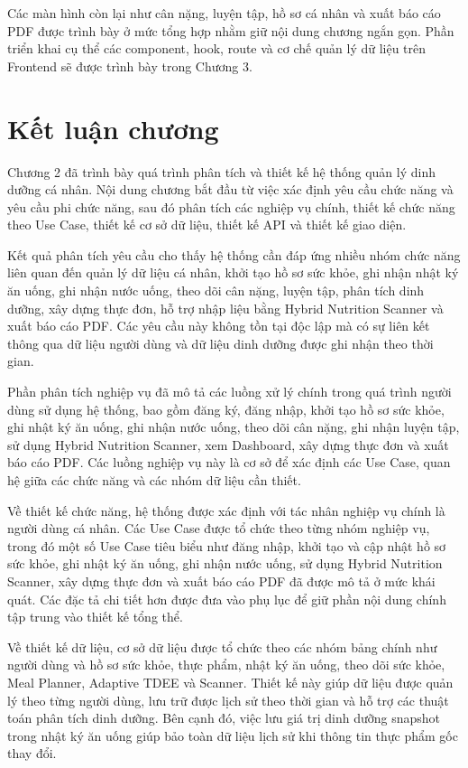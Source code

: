\documentclass[12pt, a4paper]{report}
\begin{document}
Các màn hình còn lại như cân nặng, luyện tập, hồ sơ cá nhân và xuất báo cáo PDF được trình bày ở mức tổng hợp nhằm giữ nội dung chương ngắn gọn. Phần triển khai cụ thể các component, hook, route và cơ chế quản lý dữ liệu trên Frontend sẽ được trình bày trong Chương 3.

\section{Kết luận chương}Chương 2 đã trình bày quá trình phân tích và thiết kế hệ thống quản lý dinh dưỡng cá nhân. Nội dung chương bắt đầu từ việc xác định yêu cầu chức năng và yêu cầu phi chức năng, sau đó phân tích các nghiệp vụ chính, thiết kế chức năng theo Use Case, thiết kế cơ sở dữ liệu, thiết kế API và thiết kế giao diện.

Kết quả phân tích yêu cầu cho thấy hệ thống cần đáp ứng nhiều nhóm chức năng liên quan đến quản lý dữ liệu cá nhân, khởi tạo hồ sơ sức khỏe, ghi nhận nhật ký ăn uống, ghi nhận nước uống, theo dõi cân nặng, luyện tập, phân tích dinh dưỡng, xây dựng thực đơn, hỗ trợ nhập liệu bằng Hybrid Nutrition Scanner và xuất báo cáo PDF. Các yêu cầu này không tồn tại độc lập mà có sự liên kết thông qua dữ liệu người dùng và dữ liệu dinh dưỡng được ghi nhận theo thời gian.

Phần phân tích nghiệp vụ đã mô tả các luồng xử lý chính trong quá trình người dùng sử dụng hệ thống, bao gồm đăng ký, đăng nhập, khởi tạo hồ sơ sức khỏe, ghi nhật ký ăn uống, ghi nhận nước uống, theo dõi cân nặng, ghi nhận luyện tập, sử dụng Hybrid Nutrition Scanner, xem Dashboard, xây dựng thực đơn và xuất báo cáo PDF. Các luồng nghiệp vụ này là cơ sở để xác định các Use Case, quan hệ giữa các chức năng và các nhóm dữ liệu cần thiết.

Về thiết kế chức năng, hệ thống được xác định với tác nhân nghiệp vụ chính là người dùng cá nhân. Các Use Case được tổ chức theo từng nhóm nghiệp vụ, trong đó một số Use Case tiêu biểu như đăng nhập, khởi tạo và cập nhật hồ sơ sức khỏe, ghi nhật ký ăn uống, ghi nhận nước uống, sử dụng Hybrid Nutrition Scanner, xây dựng thực đơn và xuất báo cáo PDF đã được mô tả ở mức khái quát. Các đặc tả chi tiết hơn được đưa vào phụ lục để giữ phần nội dung chính tập trung vào thiết kế tổng thể.

Về thiết kế dữ liệu, cơ sở dữ liệu được tổ chức theo các nhóm bảng chính như người dùng và hồ sơ sức khỏe, thực phẩm, nhật ký ăn uống, theo dõi sức khỏe, Meal Planner, Adaptive TDEE và Scanner. Thiết kế này giúp dữ liệu được quản lý theo từng người dùng, lưu trữ được lịch sử theo thời gian và hỗ trợ các thuật toán phân tích dinh dưỡng. Bên cạnh đó, việc lưu giá trị dinh dưỡng snapshot trong nhật ký ăn uống giúp bảo toàn dữ liệu lịch sử khi thông tin thực phẩm gốc thay đổi.
\end{document}
